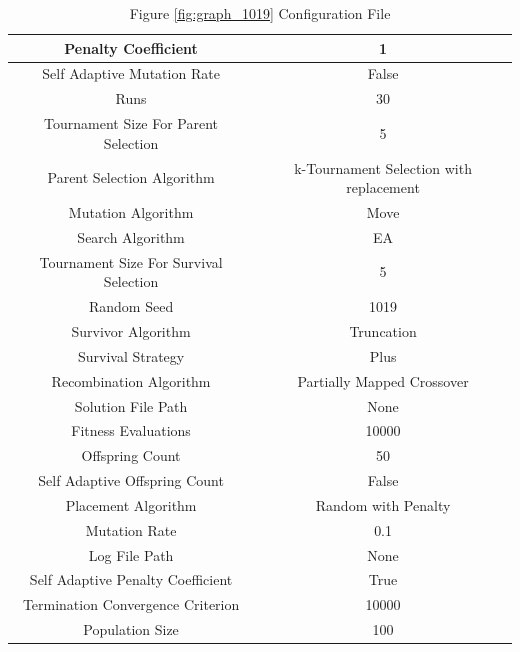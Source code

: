 \documentclass{standalone}
\begin{document}
\begin{table}[!htb]
	\centering
	\caption{Figure \ref{fig:graph_1019} Configuration File}
	\label{tab:graph_1019}
	\begin{tabular}{| c | c |}
		\hline
		Penalty Coefficient		& 1		 \\
		\hline
		Self Adaptive Mutation Rate		& False		 \\
		\hline
		Runs		& 30		 \\
		\hline
		Tournament Size For Parent Selection		& 5		 \\
		\hline
		Parent Selection Algorithm		& k-Tournament Selection with replacement		 \\
		\hline
		Mutation Algorithm		& Move		 \\
		\hline
		Search Algorithm		& EA		 \\
		\hline
		Tournament Size For Survival Selection		& 5		 \\
		\hline
		Random Seed		& 1019		 \\
		\hline
		Survivor Algorithm		& Truncation		 \\
		\hline
		Survival Strategy		& Plus		 \\
		\hline
		Recombination Algorithm		& Partially Mapped Crossover		 \\
		\hline
		Solution File Path		& None		 \\
		\hline
		Fitness Evaluations		& 10000		 \\
		\hline
		Offspring Count		& 50		 \\
		\hline
		Self Adaptive Offspring Count		& False		 \\
		\hline
		Placement Algorithm		& Random with Penalty		 \\
		\hline
		Mutation Rate		& 0.1		 \\
		\hline
		Log File Path		& None		 \\
		\hline
		Self Adaptive Penalty Coefficient		& True		 \\
		\hline
		Termination Convergence Criterion		& 10000		 \\
		\hline
		Population Size		& 100		 \\
		\hline
	\end{tabular}
\end{table}
\end{document}
